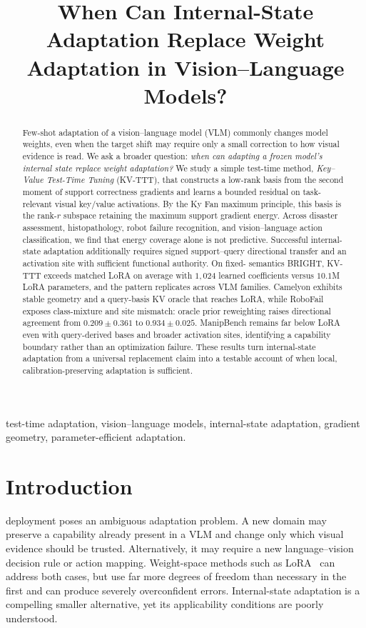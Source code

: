 \documentclass[conference]{IEEEtran}
\newcommand{\KVTTT}{\textsc{KV-TTT}}
\begin{document}
\title{When Can Internal-State Adaptation Replace Weight Adaptation in Vision--Language Models?}
\author{}
\maketitle

\begin{abstract}
Few-shot adaptation of a vision--language model (VLM) commonly changes model
weights, even when the target shift may require only a small correction to how
visual evidence is read.  We ask a broader question: \emph{when can adapting a
frozen model's internal state replace weight adaptation?}  We study a simple
test-time method, \emph{Key--Value Test-Time Tuning} (\KVTTT{}), that constructs
a low-rank basis from the second moment of support correctness gradients and
learns a bounded residual on task-relevant visual key/value activations.  By
the Ky Fan maximum principle, this basis is the rank-$r$ subspace retaining the
maximum support gradient energy.  Across disaster assessment, histopathology,
robot failure recognition, and vision--language action classification, we find
that energy coverage alone is not predictive.  Successful internal-state
adaptation additionally requires signed support--query directional transfer
and an activation site with sufficient functional authority.  On fixed-
semantics \textsc{BRIGHT}, \KVTTT{} exceeds matched LoRA on average with
$1{,}024$ learned coefficients versus $10.1$M LoRA parameters, and the pattern
replicates across VLM families.  Camelyon exhibits stable geometry and a
query-basis KV oracle that reaches LoRA, while RoboFail exposes class-mixture
and site mismatch: oracle prior reweighting raises directional agreement from
$0.209\!\pm\!0.361$ to $0.934\!\pm\!0.025$.  ManipBench remains far below LoRA
even with query-derived bases and broader activation sites, identifying a
capability boundary rather than an optimization failure.  These results turn
internal-state adaptation from a universal replacement claim into a testable
account of when local, calibration-preserving adaptation is sufficient.
\end{abstract}

\begin{IEEEkeywords}
test-time adaptation, vision--language models, internal-state adaptation,
gradient geometry, parameter-efficient adaptation.
\end{IEEEkeywords}

\section{Introduction}
 deployment poses an ambiguous adaptation problem.  A
new domain may preserve a capability already present in a VLM and change only
which visual evidence should be trusted.  Alternatively, it may require a new
language--vision decision rule or action mapping.  Weight-space methods such as
LoRA~\cite{hu2021lora} can address both cases, but use far more degrees of
freedom than necessary in the first and can produce severely overconfident
errors.  Internal-state adaptation is a compelling smaller alternative, yet
its applicability conditions are poorly understood.
\end{document}
